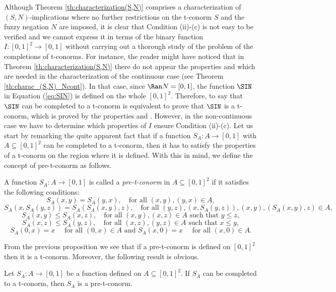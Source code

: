 Although Theorem \ref{th:characterization(S,N)} comprises a characterization of $(S,N)$-implications where no further restrictions on the t-conorm $S$ and the fuzzy negation $N$ are imposed, it is clear that Condition (ii)-(c) is not easy to be verified and we cannot express it in terms of the binary function $I:[0,1]^2 \to [0,1]$ without carrying out a thorough study of the problem of the completions of t-conorms. For instance, the reader might have noticed that in Theorem \ref{th:characterization(S,N)} there do not appear the properties \Ione and \EP which are needed in the characterization of the continuous case (see Theorem \ref{th:charac_(S,N)_Ncont}). In that case, since $\Ran N = [0,1]$, the function $\SIN$ in Equation (\ref{eq:SIN}) is defined on the whole $[0,1]^2$. Therefore, to say that $\SIN$ can be completed to a t-conorm is equivalent to prove that $\SIN$ is a t-conorm, which is proved by the properties \Ione and \EP. However, in the non-continuous case we have to determine which properties of $I$ ensure Condition (ii)-(c). Let us start by remarking the quite apparent fact that if a function $S_A: A \to [0,1]$ with $A \subseteq [0,1]^2$ can be completed to a t-conorm, then it has to satisfy the properties of a t-conorm on the region where it is defined. With this in mind, we define the concept of pre-t-conorm as follows.



\begin{definition}\label{def:SA} A function $S_A:A \to [0,1]$ is called a \emph{pre-t-conorm} in $A \subseteq [0,1]^2$ if it satisfies the following conditions:
	$$S_A(x,y)=S_A(y,x), \quad \text{for all } (x,y), (y,x) \in A,$$
	$$S_A(x,S_A(y,z))=S_A(S_A(x,y),z), \quad \text{for all } (y,z), (x,S_A(y,z)), (x,y), (S_A(x,y),z) \in A,$$
	$$S_A(x,y) \leq S_A(x,z), \quad \text{for all } (x,y),(x,z) \in A \text{ such that } y \leq z,$$
	$$S_A(x,z) \leq S_A(y,z), \quad \text{for all } (x,z),(y,z) \in A \text{ such that } x \leq y,$$
	$$S_A(0,x)=x \quad \text{ for all } (0,x) \in A \text{ and } S_A(x,0)=x \quad \text{ for all } (x,0) \in A.$$
\end{definition}
From the previous proposition we see that if a pre-t-conorm is defined on $[0,1]^2$ then it is a t-conorm. Moreover, the following result is obvious.
\begin{proposition}\label{prop:completion->pre-t-conorm} Let $S_A : A \to [0,1]$ be a function defined on $A \subseteq [0,1]^2$. If $S_A$ can be completed to a t-conorm, then $S_A$ is a pre-t-conorm.
\end{proposition}


